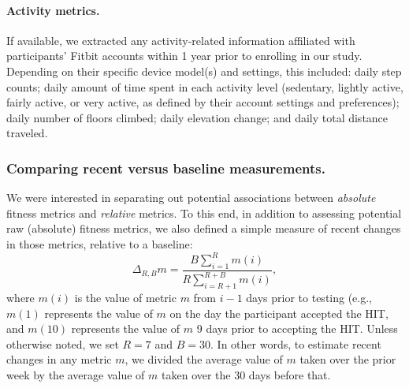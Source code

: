 \documentclass[10pt]{article}
\begin{document}
\paragraph{Activity metrics.}  If available, we extracted any
activity-related information affiliated with participants' Fitbit
accounts within 1 year prior to enrolling in our study.  Depending on
their specific device model(s) and settings, this included: daily step
counts; daily amount of time spent in each activity level (sedentary,
lightly active, fairly active, or very active, as defined by their
account settings and preferences); daily number of floors climbed;
daily elevation change; and daily total distance traveled.



\subsubsection*{Comparing recent versus baseline measurements.}
We were interested in separating out potential associations between
\textit{absolute} fitness metrics and \textit{relative} metrics.  To
this end, in addition to assessing potential raw (absolute) fitness
metrics, we also defined a simple measure of recent changes in those
metrics, relative to a baseline:
\[
  \Delta_{R, B} m = \frac{B \sum_{i = 1}^R
  m(i)}{R \sum_{i=R + 1}^{R+B}m(i)},
\]
where $m(i)$ is the value of metric $m$ from $i - 1$ days prior to
testing (e.g., $m(1)$ represents the value of $m$ on the day the
participant accepted the HIT, and $m(10)$ represents the value of $m$
9 days prior to accepting the HIT.  Unless otherwise noted, we set
$R = 7$ and $B = 30$.  In other words, to estimate recent changes in
any metric $m$, we divided the average value of $m$ taken over the
prior week by the average value of $m$ taken over the 30 days before
that.
\end{document}
